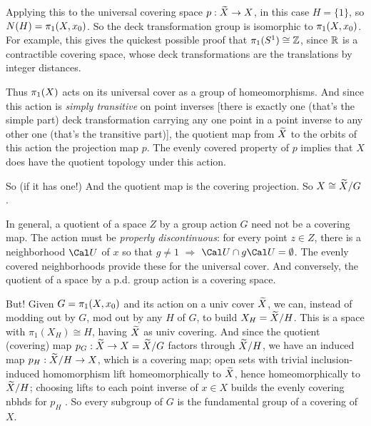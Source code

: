 \vfill
\eject

Applying this to the universal covering space
$p:\widetilde{X}\rightarrow X$, in this case $H=\{1\}$, so $N(H)=\pi_1(X,x_0)$.
So the deck transformation group is isomorphic to $\pi_1(X,x_0)$. 
For example, this gives the quickest possible proof 
that $\pi_1(S^1)\cong {\Bbb Z}$, since ${\Bbb R}$ is a 
contractible covering space, whose deck transformations
are the translations by integer distances. 

\ssk

Thus $\pi_1(X)$ acts on its universal cover as a group of
homeomorphisms. And since this action is {\it simply transitive}
on point inverses [there is exactly one (that's the simple
part) deck transformation carrying any one point in a point 
inverse to any other one (that's the transitive part)], the 
quotient map from $\widetilde{X}$ to the orbits of this action 
the projection map $p$. The evenly covered property of $p$ implies
that $X$ does have the quotient topology under this action.

\msk

So  (if it has
one!)  And the quotient map is the covering 
projection. 
So $X\cong \widetilde{X}/G$ . 

\ssk

In general, a quotient of a 
space $Z$ by a group action $G$ 
need not be 
a covering map. The action must be {\it properly discontinuous}: 
for every point 
$z\in Z$, there is a neighborhood ${\Cal U}$ of $x$ so that $g\neq 1$ $\Rightarrow$
${\Cal U}\cap g{\Cal U}=\emptyset$. The evenly covered neighborhoods
provide these for the universal cover. And conversely, the quotient of a space by a 
p.d. group action is a covering space. 

\vfill
\eject

But! Given $G=\pi_1(X,x_0)$ and its 
action on a univ cover $\widetilde{X}$, we can, instead of modding out by $G$,
mod out by any  $H$ of $G$, to build $X_H=\widetilde{X}/H$. 
This is a space with $\pi_1(X_H)\cong H$, having $\widetilde{X}$ as univ covering.
And since the quotient (covering) map $p_G:\widetilde{X}\rightarrow X=\widetilde{X}/G$ factors through $\widetilde{X}/H$,
we have an induced map $p_H:\widetilde{X}/H\rightarrow X$, which is a covering map; open sets with
trivial inclusion-induced homomorphism lift homeomorphically to $\widetilde{X}$,
hence homeomorphically to $\widetilde{X}/H$; choosing lifts to each point inverse of $x\in X$
builds the evenly covering nbhds for $p_H$ . So every subgroup of $G$ is the
fundamental group of a covering of $X$. 

